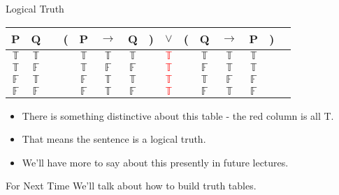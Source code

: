 \documentclass[
  ignorenonframetext,
]{beamer}
\providecommand{\tightlist}{%
  \setlength{\itemsep}{0pt}\setlength{\parskip}{0pt}}
\renewcommand{\,}{\text{, }}
\def\True{\mathbb{T}}
\def\False{\mathbb{F}}
\begin{document}
\begin{frame}{Logical Truth}
\protect\hypertarget{logical-truth}{}
\begin{center}
\begin{tabular}{@{ }c@{ }@{ }c | c@{ }@{}c@{}@{ }c@{ }@{ }c@{ }@{ }c@{ }@{}c@{}@{ }c@{ }@{}c@{}@{ }c@{ }@{ }c@{ }@{ }c@{ }@{}c@{}@{ }c}
P & Q &  & ( & P & $\rightarrow$ & Q & ) & $\lor$ & ( & Q & $\rightarrow$ & P & ) & \\
\hline 
$\True$ & $\True$ &  &  & $\True$ & $\True$ & $\True$ &  & \textcolor{red}{$\True$} &  & $\True$ & $\True$ & $\True$ &  & \\
$\True$ & $\False$ &  &  & $\True$ & $\False$ & $\False$ &  & \textcolor{red}{$\True$} &  & $\False$ & $\True$ & $\True$ &  & \\
$\False$ & $\True$ &  &  & $\False$ & $\True$ & $\True$ &  & \textcolor{red}{$\True$} &  & $\True$ & $\False$ & $\False$ &  & \\
$\False$ & $\False$ &  &  & $\False$ & $\True$ & $\False$ &  & \textcolor{red}{$\True$} &  & $\False$ & $\True$ & $\False$ &  & \\
\end{tabular}

\end{center}

\begin{itemize}
\tightlist
\item
  There is something distinctive about this table - the red column is
  all T.
\item
  That means the sentence is a logical truth.
\item
  We'll have more to say about this presently in future lectures.
\end{itemize}
\end{frame}

\begin{frame}{For Next Time}
\protect\hypertarget{for-next-time}{}
We'll talk about how to build truth tables.
\end{frame}
\end{document}

